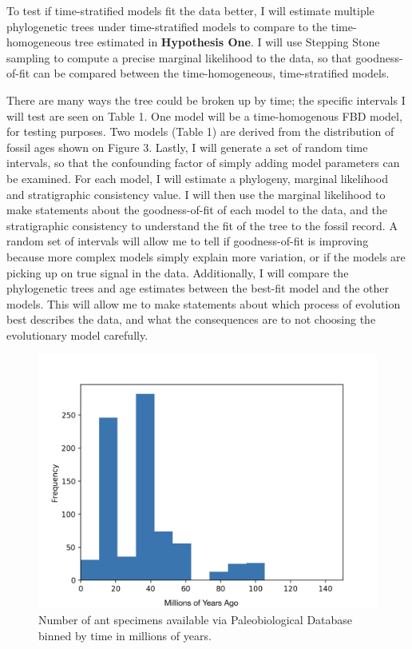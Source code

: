 \documentclass[12pt]{article}
\begin{document}
To test if time-stratified models fit the data better, I will estimate multiple phylogenetic trees under time-stratified models to compare to the time-homogeneous tree estimated in \textbf{Hypothesis One}. 
I will use Stepping Stone sampling \cite{Xie2011} to compute a precise marginal likelihood to the data, so that goodness-of-fit can be compared between the time-homogeneous, time-stratified models. \par
There are many ways the tree could be broken up by time; the specific intervals I will test are seen on Table 1.
One model will be a time-homogenous FBD model, for testing purposes.
Two models (Table 1) are derived from the distribution of fossil ages shown on  Figure 3.
Lastly, I will generate a set of random time intervals, so that the confounding factor of simply adding model parameters can be examined. 
For each model, I will estimate a phylogeny, marginal likelihood and stratigraphic consistency value. 
I will then use the marginal likelihood to make statements about the goodness-of-fit of each model to the data, and the stratigraphic consistency to understand the fit of the tree to the fossil record.
A random set of intervals will allow me to tell if goodness-of-fit is improving because more complex models simply explain more variation, or if the models are picking up on true signal in the data.
Additionally, I will compare the phylogenetic trees and age estimates between the best-fit model and the other models.
This will allow me to make statements about which process of evolution best describes the data, and what the consequences are to not choosing the evolutionary model carefully. \par
\begin{figure}

  \caption{Number of ant specimens available via Paleobiological Database binned by time in millions of years.}
  \centering
    \includegraphics[width=.75\textwidth]{abundance_hist}
    \end{figure}
\end{document}
